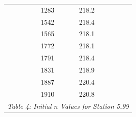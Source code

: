 \begin{center}
\begin{tabular}{|cc||cc||cc|}
             &                        & 1283 & 218.2                         &          &                                    \\
             &                        & 1542 & 218.4                         &          &                                    \\
             &                        & 1565 & 218.1                         &          &                                    \\
             &                        & 1772 & 218.1                         &          &                                    \\
             &                        & 1791 & 218.4                         &          &                                    \\
             &                        & 1831 & 218.9                         &          &                                    \\
             &                        & 1887 & 220.4                         &          &                                    \\
             &                        & 1910 & 220.8                         &          &                                    \\
             \hline\multicolumn{6}{c}{\emph{Table 4: Initial $n$ Values for Station 5.99}}
\end{tabular}


\end{center}
